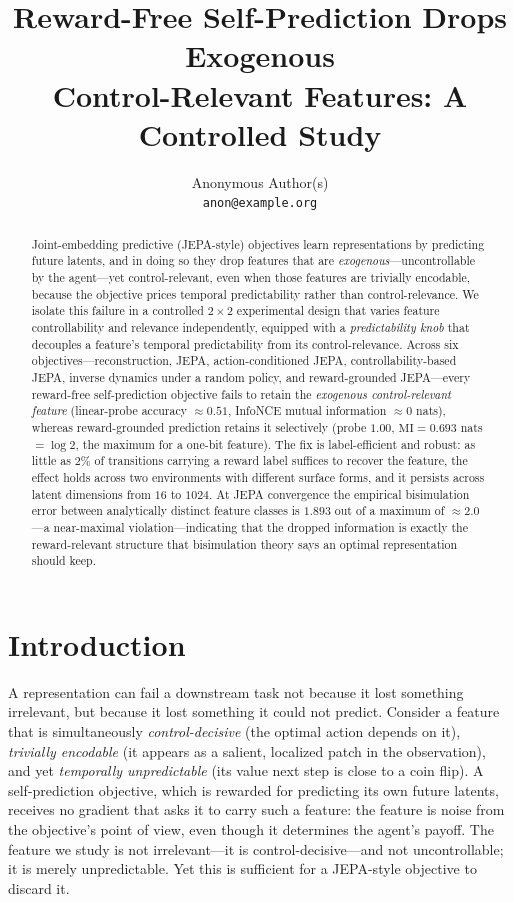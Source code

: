 \documentclass[11pt]{article}
\title{\textbf{Reward-Free Self-Prediction Drops Exogenous\\ Control-Relevant Features: A Controlled Study}}
\author{
  Anonymous Author(s)\\
  \texttt{anon@example.org}
}
\date{}
\newcommand{\probe}{linear-probe accuracy}
\begin{document}
\maketitle

\begin{abstract}
\noindent
Joint-embedding predictive (JEPA-style) objectives learn representations by predicting future
latents, and in doing so they drop features that are \emph{exogenous}---uncontrollable by the
agent---yet control-relevant, even when those features are trivially encodable, because the
objective prices temporal predictability rather than control-relevance. We isolate this failure
in a controlled $2\times2$ experimental design that varies feature controllability and relevance
independently, equipped with a \emph{predictability knob} that decouples a feature's temporal
predictability from its control-relevance. Across six objectives---reconstruction, JEPA,
action-conditioned JEPA, controllability-based JEPA, inverse dynamics under a random policy, and
reward-grounded JEPA---every reward-free self-prediction objective fails to retain the
\emph{exogenous control-relevant feature} (\probe{} $\approx 0.51$, InfoNCE mutual information
$\approx 0$ nats), whereas reward-grounded prediction retains it selectively (probe $1.00$,
$\mathrm{MI}=0.693$ nats $=\log 2$, the maximum for a one-bit feature). The fix is label-efficient
and robust: as little as $2\%$ of transitions carrying a reward label suffices to recover the
feature, the effect holds across two environments with different surface forms, and it persists
across latent dimensions from $16$ to $1024$. At JEPA convergence the empirical bisimulation error
between analytically distinct feature classes is $1.893$ out of a maximum of $\approx 2.0$---a
near-maximal violation---indicating that the dropped information is exactly the reward-relevant
structure that bisimulation theory says an optimal representation should keep.
\end{abstract}

\section{Introduction}

A representation can fail a downstream task not because it lost something irrelevant, but because
it lost something it could not predict. Consider a feature that is simultaneously
\emph{control-decisive} (the optimal action depends on it), \emph{trivially encodable} (it appears
as a salient, localized patch in the observation), and yet \emph{temporally unpredictable} (its
value next step is close to a coin flip). A self-prediction objective, which is rewarded for
predicting its own future latents, receives no gradient that asks it to carry such a feature: the
feature is noise from the objective's point of view, even though it determines the agent's payoff.
The feature we study is not irrelevant---it is control-decisive---and not uncontrollable; it is
merely unpredictable. Yet this is sufficient for a JEPA-style objective to discard it.
\end{document}
